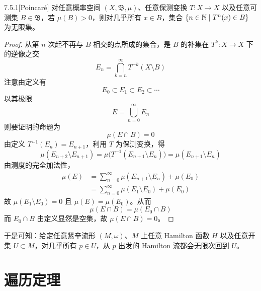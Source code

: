 \begin{theorem*}{7.5.1}[Poincaré]
对任意概率空间 $(X,\mathfrak{B},\mu)$、任意保测变换 $T\colon X\to X$ 以及任意可测集 $B\in\mathfrak{B}$，若 $\mu(B)>0$，则对几乎所有 $x\in B$，集合 $\{n\in\mathbb{N}\mid T^n(x)\in B\}$ 为无限集。
\end{theorem*}

\begin{proof}
从第 $n$ 次起不再与 $B$ 相交的点所成的集合，是 $B$ 的补集在 $T^k\colon X\to X$ 下的逆像之交
\begin{equation}
  E_n=\bigcap_{k=n}^{\infty}T^{-k}(X\setminus B)
  \tag{7.5.1}
\end{equation}
注意由定义有
\begin{equation}
  E_0\subset E_1\subset E_2\subset\cdots
  \tag{7.5.2}
\end{equation}
以其极限
\begin{equation}
  E=\bigcup_{n=0}^{\infty}E_n
  \tag{7.5.3}
\end{equation}
则要证明的命题为
\begin{equation}
  \mu(E\cap B)=0
  \tag{7.5.4}
\end{equation}
由定义 $T^{-1}(E_n)=E_{n+1}$，利用 $T$ 为保测变换，得
\begin{equation}
  \mu(E_{n+2}\setminus E_{n+1})
  =\mu\bigl(T^{-1}(E_{n+1}\setminus E_n)\bigr)
  =\mu(E_{n+1}\setminus E_n)
  \tag{7.5.5}
\end{equation}
由测度的完全加法性，
\begin{align}
  \mu(E)&=\sum_{n=0}^{\infty}\mu(E_{n+1}\setminus E_n)+\mu(E_0) \tag{7.5.6}\\
  &=\sum_{n=0}^{\infty}\mu(E_1\setminus E_0)+\mu(E_0) \tag{7.5.7}
\end{align}
故 $\mu(E_1\setminus E_0)=0$ 且 $\mu(E)=\mu(E_0)$。从而
\begin{equation}
  \mu(E\cap B)=\mu(E_0\cap B)
  \tag{7.5.8}
\end{equation}
而 $E_0\cap B$ 由定义显然是空集，故 $\mu(E\cap B)=0$。
\end{proof}

于是可知：给定任意紧辛流形 $(M,\omega)$、$M$ 上任意 Hamilton 函数 $H$ 以及任意开集 $U\subset M$，对几乎所有 $p\in U$，从 $p$ 出发的 Hamilton 流都会无限次回到 $U$。

\section{遍历定理}

